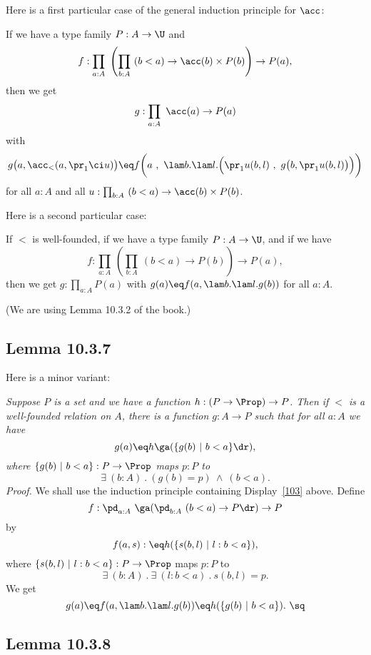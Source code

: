 \documentclass[12pt]{article}
\begin{document}
Here is a first particular case of the general induction principle for $\acc$:

If we have a type family $P:A\to\U$ and %
$$
f:\prod_{a:A}\ \left(\prod_{b:A}\ (b<a)\to\acc(b)\times P(b)\right)\to P(a),%
$$ 
then we get 
$$
g:\prod_{a:A}\ \acc(a)\to P(a)
$$
with
$$
g\big(a,\acc_<(a,\pr_1\ci u)\big)\eq f\bigg(a\ ,\ \lam b.\lam l.\Big(\pr_1 u(b,l)\ ,\ g\big(b,\pr_1 u(b,l)\big)\Big)\bigg)
$$
for all $a:A$ and all $u:\prod_{b:A}\ (b<a)\to\acc(b)\times P(b)$. 

Here is a second particular case:

If $<$ is well-founded, if we have a type family $P:A\to\U$, and if we have 
\begin{equation}\label{103}
f:\prod_{a:A}\ \left(\prod_{b:A}\ (b<a)\to P(b)\right)\to P(a),
\end{equation} 
then we get $g:\prod_{a:A}P(a)$ with $g(a)\eq f(a,\lam b.\lam l.g(b))$ for all $a:A$.

(We are using Lemma 10.3.2 of the book.)


\subsection{Lemma 10.3.7}%

Here is a minor variant:

\nn\emph{Suppose $P$ is a set and we have a function $h:(P\to\Prop)\to P$. Then if $<$ is a well-founded relation on $A$, there is a function $g:A\to P$ such that for all $a:A$ we have} 
$$
g(a)\eq h\ga(\{g(b)\ \vert\ b<a\}\dr),
$$ 
\emph{where $\{g(b)\ \vert\ b<a\}:P\to\Prop$ maps $p:P$ to} 
$$
\exists\ (b:A)\ .\ (g(b)=p)\ \wedge\ (b<a).
$$ 
\emph{Proof.} We shall use the induction principle containing Display~\eqref{103} above. Define 
$$
f:\pd_{a:A}\ \ga(\pd_{b:A}\ (b<a)\to P\dr)\to P
$$ 
by 
$$
f(a,s):\eq h(\{s(b,l)\ \vert\ l:b<a\}),
$$ 
where $\{s(b,l)\ \vert\ l:b<a\}:P\to\Prop$ maps $p:P$ to 
$$
\exists\ (b:A)\ .\ \exists\ (l:b<a)\ .\ s(b,l)=p.
$$ 
We get 
$$
g(a)\eq f(a,\lam b.\lam l.g(b))\eq h(\{g(b)\ \vert\ b<a\}).\ \sq
$$ 


\subsection{Lemma 10.3.8}
\end{document}

